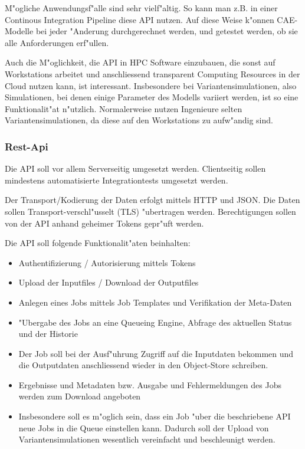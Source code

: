 \documentclass[12pt]{article}
\begin{document}
M"ogliche Anwendungsf"alle sind sehr vielf"altig. So kann man z.B. in einer Continous Integration Pipeline diese API nutzen. Auf diese Weise k"onnen CAE-Modelle bei jeder "Anderung durchgerechnet werden, und getestet werden, ob sie alle Anforderungen erf"ullen.

Auch die M"oglichkeit, die API in HPC Software einzubauen, die sonst auf Workstations arbeitet und anschliessend transparent Computing Resources in der Cloud nutzen kann, ist interessant. Insbesondere bei Variantensimulationen, also Simulationen, bei denen einige Parameter des Modells variiert werden, ist so eine Funktionalit"at n"utzlich. Normalerweise nutzen Ingenieure selten Variantensimulationen, da diese auf den Workstations zu aufw"andig sind.

\subsubsection{Rest-Api}

Die API soll vor allem Serverseitig umgesetzt werden. Clientseitig sollen mindestens automatisierte Integrationtests umgesetzt werden.

Der Transport/Kodierung der Daten erfolgt mittels HTTP und JSON. Die Daten sollen Transport-verschl"usselt (TLS) "ubertragen werden. Berechtigungen sollen von der API anhand geheimer Tokens gepr"uft werden.

Die API soll folgende Funktionalit"aten beinhalten:

\begin{itemize}
\item Authentifizierung / Autorisierung mittels Tokens
\item Upload der Inputfiles / Download der Outputfiles
\item Anlegen eines Jobs mittels Job Templates und Verifikation der Meta-Daten
\item "Ubergabe des Jobs an eine Queueing Engine, Abfrage des aktuellen Status und der Historie
\item Der Job soll bei der Ausf"uhrung Zugriff auf die Inputdaten bekommen und die Outputdaten anschliessend wieder in den Object-Store schreiben.
\item Ergebnisse und Metadaten bzw. Ausgabe und Fehlermeldungen des Jobs werden zum Download angeboten
\item Insbesondere soll es m"oglich sein, dass ein Job "uber die beschriebene API neue Jobs in die Queue einstellen kann. Dadurch soll der Upload von Variantensimulationen wesentlich vereinfacht und beschleunigt werden.
\end{itemize}
\end{document}
